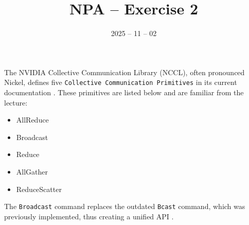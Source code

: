 \documentclass{article}
\date{2025 -- 11 -- 02}
\title{NPA -- Exercise 2}
\begin{document}
\maketitle
    \section{}

    \subsection{}

    The NVIDIA Collective Communication Library (NCCL), often pronounced \glqq Nickel\grqq, defines five \texttt{Collective Communication Primitives} in its current documentation \cite{nvidia_nccl_docs}. These primitives are listed below and are familiar from the lecture:

    \begin{itemize}
        \item AllReduce 
        \item Broadcast
        \item Reduce
        \item AllGather
        \item ReduceScatter
    \end{itemize}

    The \texttt{Broadcast} command replaces the outdated \texttt{Bcast} command, which was previously implemented, thus creating a unified API \cite{hu2025demystifyingncclindepthanalysis}.
    
    \subsection{}

\end{document}
